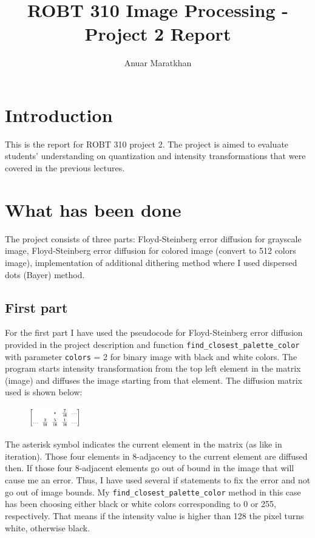 \documentclass{IEEEtran}
\begin{document}
\title{ROBT 310 Image Processing - Project 2 Report}

\author{Anuar Maratkhan}

\maketitle

\section{Introduction}
This is the report for ROBT 310 project 2. The project is aimed to evaluate students' understanding on quantization and intensity transformations that were covered in the previous lectures.

\section{What has been done}
The project consists of three parts: Floyd-Steinberg error diffusion for grayscale image, Floyd-Steinberg error diffusion for colored image (convert to 512 colors image), implementation of additional dithering method where I used dispersed dots (Bayer) method.

\subsection{First part}
For the first part I have used the pseudocode for Floyd-Steinberg error diffusion provided in the project description and function \texttt{find{\_}closest{\_}palette{\_}color} with parameter \texttt{colors} = 2 for binary image with black and white colors. The program starts intensity transformation from the top left element in the matrix (image) and diffuses the image starting from that element. The diffusion matrix used is shown below:

\begin{figure}[h]
	\centering
	\includegraphics[width=0.2\textwidth]{diffusion_matrix.png}
\end{figure}

The asterisk symbol indicates the current element in the matrix (as like in iteration). Those four elements in 8-adjacency to the current element are diffused then. If those four 8-adjacent elements go out of bound in the image that will cause me an error. Thus, I have used several if statements to fix the error and not go out of image bounds. My \texttt{find{\_}closest{\_}palette{\_}color} method in this case has been choosing either black or white colors corresponding to 0 or 255, respectively. That means if the intensity value is higher than 128 the pixel turns white, otherwise black.
\end{document}
